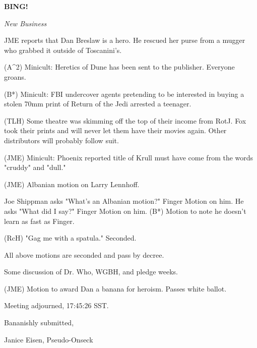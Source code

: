 \documentclass[12pt]{article}
\newcommand{\bing}{{\bf BING!} }
\newcommand{\goto}[1]{\bing \vskip 12pt \centerline{{\em{#1}}}}
\begin{document}
\goto{New Business}

JME reports that Dan Breslaw is a hero. He rescued her purse from a mugger who grabbed it outside of Toscanini's.

(A^2) Minicult: Heretics of Dune has been sent to the publisher. Everyone groans.

(B*) Minicult: FBI undercover agents pretending to be interested in buying a stolen 70mm print of Return of the Jedi arrested a teenager.

(TLH) Some theatre was skimming off the top of their income from RotJ. Fox took their prints and will never let them have their movies again. Other distributors will probably follow suit.

(JME) Minicult: Phoenix reported title of Krull must have come from the words "cruddy" and "dull."

(JME) Albanian motion on Larry Lennhoff.

Joe Shippman asks "What's an Albanian motion?" Finger Motion on him. He asks "What did I say?" Finger Motion on him. (B*) Motion to note he doesn't learn as fast as Finger.

(RcH) "Gag me with a spatula." Seconded.

All above motions are seconded and pass by decree.

Some discussion of Dr. Who, WGBH, and pledge weeks.

(JME) Motion to award Dan a banana for heroism. Passes white ballot.

\vspace{12pt}

\noindent
Meeting adjourned, 17:45:26 SST.

\vspace{18pt}

\centerline{Bananishly submitted,}
\centerline{Janice Eisen, Pseudo-Onseck}
\end{document}
